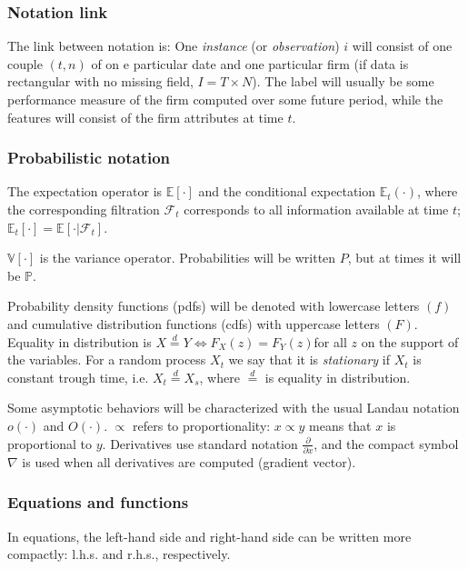 \subsubsection{Notation link}
The link between notation is: One \textit{instance} (or \textit{observation}) $i$ will consist of one couple $(t,n)$ of on e particular date and one particular firm (if data is rectangular with no missing field, $I = T \times N$). The label will usually be some performance measure of the firm computed over some future period, while the features will consist of the firm attributes at time 
$t$.

\subsubsection{Probabilistic notation}
The expectation operator is $\mathbb{E}[ \cdot ]$ and the conditional expectation $\mathbb{E}_{t}(\cdot)$, where the corresponding filtration $\mathcal{F}_{t}$ corresponds to all information available at time $t$; $\mathbb{E}_{t}[ \cdot ]  = \mathbb{E}[ \cdot | \mathcal{F}_{t}]$. 

$\mathbb{V}[ \cdot ]$ is the variance operator. Probabilities will be written $P$, but at times it will be $\mathbb{P}$. 

Probability density functions (pdfs) will be denoted with lowercase letters $(f)$ and cumulative distribution functions (cdfs) with uppercase letters $(F)$. Equality in distribution is $X \overset{d}{=} Y \iff F_{X}(z) = F_{Y}(z)$for all $z$ on the support of the variables. For a random process $X_{t}$ we say that it is \textit{stationary} if $X_{t}$ is constant trough time, i.e. $X_{t} \overset{d}{=} X_{s}$, where $\overset{d}{=}$ is equality in distribution.

Some asymptotic behaviors will be characterized with the usual Landau notation $o( \cdot )$ and $O( \cdot )$. $\varpropto$ refers to proportionality: $x \varpropto y$ means that $x$ is proportional to $y$. Derivatives use standard notation $\frac{\partial }{\partial x}$, and the compact symbol $\nabla$ is used when all derivatives are computed (gradient vector).

\subsubsection{Equations and functions}
In equations, the left-hand side and right-hand side can be written more compactly: l.h.s. and r.h.s., respectively.

